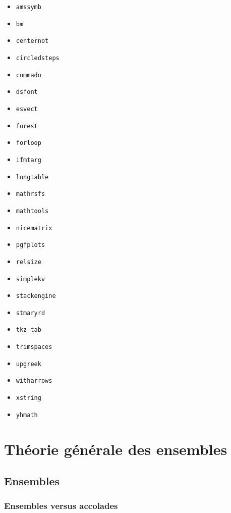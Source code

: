 \documentclass[12pt,a4paper]{book}
\theoremstyle{definition}
\begin{document}
{{\begin{multicols}{4}
    \begin{itemize}
        \item \verb#amssymb#
        \item \verb#bm#
        \item \verb#centernot#
        \item \verb#circledsteps#
        \item \verb#commado#
        \item \verb#dsfont#
        \item \verb#esvect#
        \item \verb#forest#
        \item \verb#forloop#
        \item \verb#ifmtarg#
        \item \verb#longtable#
        \item \verb#mathrsfs#
        \item \verb#mathtools#
        \item \verb#nicematrix#
        \item \verb#pgfplots#
        \item \verb#relsize#
        \item \verb#simplekv#
        \item \verb#stackengine#
        \item \verb#stmaryrd#
        \item \verb#tkz-tab#
        \item \verb#trimspaces#
        \item \verb#upgreek#
        \item \verb#witharrows#
        \item \verb#xstring#
        \item \verb#yhmath#
    \end{itemize}
\end{multicols}
\chapter{Théorie générale des ensembles}

\section{Ensembles}

\subsection{Ensembles versus accolades}

}}
\end{document}
